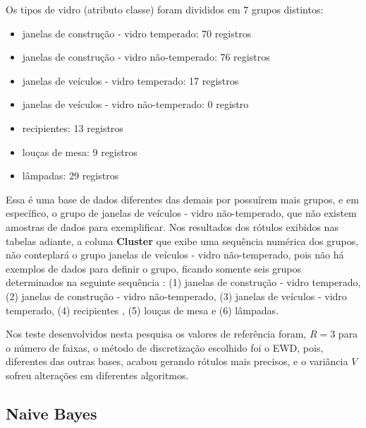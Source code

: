 Os tipos de vidro (atributo classe) foram divididos em 7 grupos distintos:
\begin{itemize} [noitemsep]
 \item janelas de construção - vidro temperado: 70 registros
 \item janelas de construção - vidro não-temperado: 76 registros
 \item janelas de veículos - vidro temperado: 17 registros
 \item janelas de veículos - vidro não-temperado: 0 registro
 \item recipientes: 13 registros
 \item louças de mesa: 9 registros
 \item lâmpadas: 29 registros 
\end{itemize}

Essa é uma base de dados diferentes das demais por possuírem mais grupos, e em específico, o grupo de janelas de veículos - vidro não-temperado, que não existem amostras de dados para exemplificar. Nos resultados dos rótulos exibidos nas tabelas adiante, a coluna \textbf{Cluster} que exibe uma sequência numérica dos grupos, não conteplará o grupo janelas de veículos - vidro não-temperado, pois não há exemplos de dados para definir o grupo,  ficando somente seis grupos determinados na seguinte sequência : (1) janelas de construção - vidro temperado, (2) janelas de construção - vidro não-temperado, (3) janelas de veículos - vidro temperado, (4) recipientes , (5) louças de mesa e (6) lâmpadas.

Nos teste desenvolvidos nesta pesquisa os valores de referência foram, ${R=3}$ para o número de faixas, o método de discretização escolhido foi o EWD, pois, diferentes das outras bases, acabou gerando rótulos mais precisos, e o variância  ${V}$ sofreu alterações em diferentes algoritmos.


\subsection{Naive Bayes} \label{cap:resultados:ssec:glass:nb}

